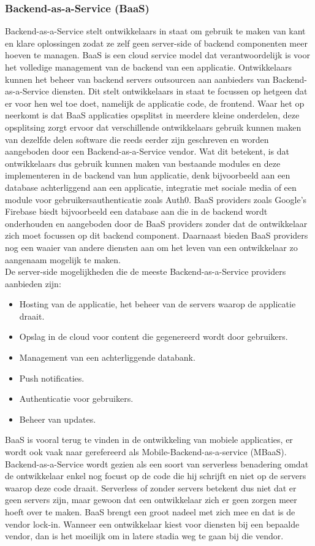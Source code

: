 \subsubsection{Backend-as-a-Service (BaaS)}
Backend-as-a-Service stelt ontwikkelaars in staat om gebruik te maken van kant en klare oplossingen zodat ze zelf geen server-side of backend componenten meer hoeven te managen. BaaS is een cloud service model dat verantwoordelijk is voor het volledige management van de backend van een applicatie. Ontwikkelaars kunnen het beheer van backend servers outsourcen aan aanbieders van Backend-as-a-Service diensten. Dit stelt ontwikkelaars in staat te focussen op hetgeen dat er voor hen wel toe doet, namelijk de applicatie code, de frontend. Waar het op neerkomt is dat BaaS applicaties opsplitst in meerdere kleine onderdelen, deze opsplitsing zorgt ervoor dat verschillende ontwikkelaars gebruik kunnen maken van dezelfde delen software die reeds eerder zijn geschreven en worden aangeboden door een Backend-as-a-Service vendor. Wat dit betekent, is dat ontwikkelaars dus gebruik kunnen maken van bestaande modules en deze implementeren in de backend van hun applicatie, denk bijvoorbeeld aan een database achterliggend aan een applicatie, integratie met sociale media of een module voor gebruikersauthenticatie zoals Auth0. BaaS providers zoals Google's Firebase biedt bijvoorbeeld een database aan die in de backend wordt onderhouden en aangeboden door de BaaS providers zonder dat de ontwikkelaar zich moet focussen op dit backend component. Daarnaast bieden BaaS providers nog een waaier van andere diensten aan om het leven van een ontwikkelaar zo aangenaam mogelijk te maken.
\\
De server-side mogelijkheden die de meeste Backend-as-a-Service providers aanbieden zijn:
\begin{itemize}
    \item Hosting van de applicatie, het beheer van de servers waarop de applicatie draait.
    \item Opslag in de cloud voor content die gegenereerd wordt door gebruikers.
    \item Management van een achterliggende databank.
    \item Push notificaties.
    \item Authenticatie voor gebruikers.
    \item Beheer van updates.
\end{itemize}
BaaS is vooral terug te vinden in de ontwikkeling van mobiele applicaties, er wordt ook vaak naar gerefereerd als Mobile-Backend-as-a-service (MBaaS). Backend-as-a-Service wordt gezien als een soort van serverless benadering omdat de ontwikkelaar enkel nog focust op de code die hij schrijft en niet op de servers waarop deze code draait. Serverless of zonder servers betekent dus niet dat er geen servers zijn, maar gewoon dat een ontwikkelaar zich er geen zorgen meer hoeft over te maken. BaaS brengt een groot nadeel met zich mee en dat is de vendor lock-in. Wanneer een ontwikkelaar kiest voor diensten bij een bepaalde vendor, dan is het moeilijk om in latere stadia weg te gaan bij die vendor. \autocite{Cloudflare2019} 

